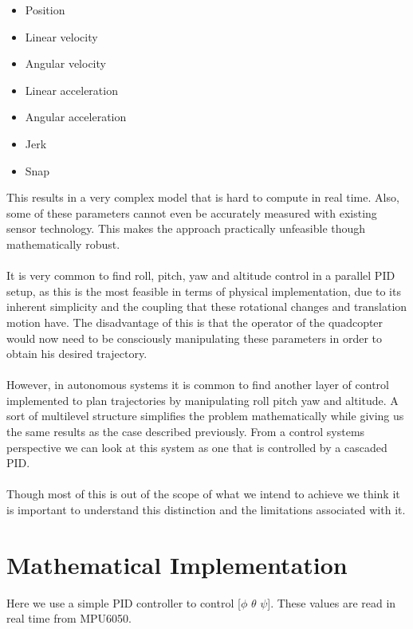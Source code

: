 \documentclass[9pt]{article}
\begin{document}
\begin{itemize}
\item Position
\item Linear velocity
\item Angular velocity
\item Linear acceleration
\item Angular acceleration
\item Jerk
\item Snap
\end{itemize}

\noindent This results in a very complex model that is hard to compute in real time. Also, some of these parameters cannot even be accurately measured with existing sensor technology. This makes the approach practically unfeasible though mathematically robust.\\ \\

\noindent It is very common to find roll, pitch, yaw and altitude control in a parallel PID setup, as this is the most feasible in terms of physical implementation, due to its inherent simplicity and the coupling that these rotational changes and translation motion have. The disadvantage of this is that the operator of the quadcopter would now need to be consciously manipulating these parameters in order to obtain his desired trajectory.\\ \\
However, in autonomous systems it is common to find another layer of control implemented to plan trajectories by manipulating roll pitch yaw and altitude. A sort of multilevel structure simplifies the problem mathematically while giving us the same results as the case described previously. From a control systems perspective we can look at this system as one that is controlled by a cascaded PID.\\ \\
Though most of this is out of the scope of what we intend to achieve we think it is important to understand this distinction and the limitations associated with it.

\newpage

\section{Mathematical Implementation}

Here we use a simple PID controller to control [$\phi$ $\theta$ $\psi$]. These values are read in real time from MPU6050.\\
\end{document}
